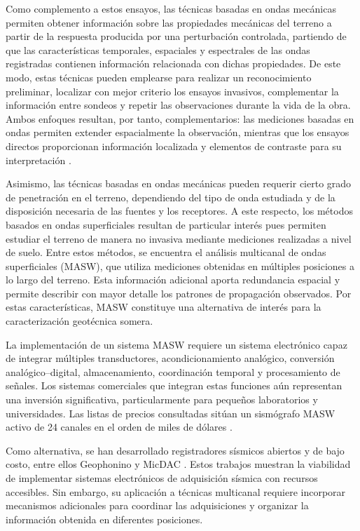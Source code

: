 	Como complemento a estos ensayos, las técnicas basadas en ondas mecánicas permiten obtener información sobre las propiedades mecánicas del terreno a partir de la respuesta producida por una perturbación controlada, partiendo de que las características temporales, espaciales y espectrales de las ondas registradas contienen información relacionada con dichas propiedades. De este modo, estas técnicas pueden emplearse para realizar un reconocimiento preliminar, localizar con mejor criterio los ensayos invasivos, complementar la información entre sondeos y repetir las observaciones durante la vida de la obra. Ambos enfoques resultan, por tanto, complementarios: las mediciones basadas en ondas permiten extender espacialmente la observación, mientras que los ensayos directos proporcionan información localizada y elementos de contraste para su interpretación \citep{Foti2014,Foti2018}.
	
	Asimismo, las técnicas basadas en ondas mecánicas pueden requerir cierto grado de penetración en el terreno, dependiendo del tipo de onda estudiada y de la disposición necesaria de las fuentes y los receptores. A este respecto, los métodos basados en ondas superficiales resultan de particular interés pues permiten estudiar el terreno de manera no invasiva mediante mediciones realizadas a nivel de suelo. Entre estos métodos, se encuentra el análisis multicanal de ondas superficiales (MASW), que utiliza mediciones obtenidas en múltiples posiciones a lo largo del terreno. Esta información adicional aporta redundancia espacial y permite describir con mayor detalle los patrones de propagación observados. Por estas características, MASW constituye una alternativa de interés para la caracterización geotécnica somera.
	
	La implementación de un sistema MASW requiere un sistema electrónico capaz de integrar múltiples transductores, acondicionamiento analógico, conversión analógico--digital, almacenamiento, coordinación temporal y procesamiento de señales. Los sistemas comerciales que integran estas funciones aún representan una inversión significativa, particularmente para pequeños laboratorios y universidades. Las listas de precios consultadas sitúan un sismógrafo MASW activo de 24 canales en el orden de miles de dólares \citep{PASIPrice2022,GeometricsPrice2023}.
	
	Como alternativa, se han desarrollado registradores sísmicos abiertos y de bajo costo, entre ellos Geophonino y MicDAC \citep{Llorens2016,Kafadar2020}. Estos trabajos muestran la viabilidad de implementar sistemas electrónicos de adquisición sísmica con recursos accesibles. Sin embargo, su aplicación a técnicas multicanal requiere incorporar mecanismos adicionales para coordinar las adquisiciones y organizar la información obtenida en diferentes posiciones.
	
